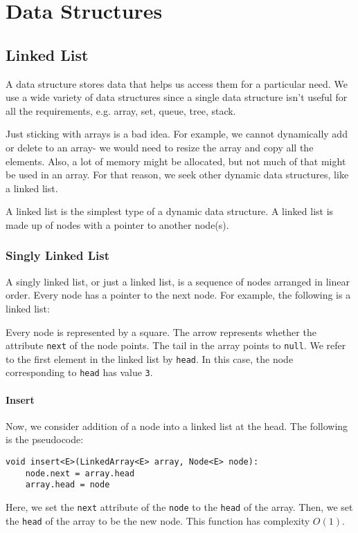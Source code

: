 \documentclass[a4paper, openany]{memoir}
\begin{document}
\chapter{Data Structures}
\section{Linked List}
A data structure stores data that helps us access them for a particular need. We use a wide variety of data structures since a single data structure isn't useful for all the requirements, e.g. array, set, queue, tree, stack. 

\noindent Just sticking with arrays is a bad idea. For example, we cannot dynamically add or delete to an array- we would need to resize the array and copy all the elements. Also, a lot of memory might be allocated, but not much of that might be used in an array. For that reason, we seek other dynamic data structures, like a linked list. 

\noindent A linked list is the simplest type of a dynamic data structure. A linked list is made up of nodes with a pointer to another node(s).

\subsection{Singly Linked List}
A singly linked list, or just a linked list, is a sequence of nodes arranged in linear order. Every node has a pointer to the next node. For example, the following is a linked list:
\begin{center}
\end{center}
Every node is represented by a square. The arrow represents whether the attribute \texttt{next} of the node points. The tail in the array points to \texttt{null}. We refer to the first element in the linked list by \texttt{head}. In this case, the node corresponding to \texttt{head} has value \texttt{3}.

\subsubsection{Insert}
\noindent Now, we consider addition of a node into a linked list at the head. The following is the pseudocode:
\begin{lstlisting}[language=pseudocode]
void insert<E>(LinkedArray<E> array, Node<E> node):
    node.next = array.head
    array.head = node
\end{lstlisting}
Here, we set the \texttt{next} attribute of the \texttt{node} to the \texttt{head} of the array. Then, we set the \texttt{head} of the array to be the new node. This function has complexity $O(1)$.
\end{document}
